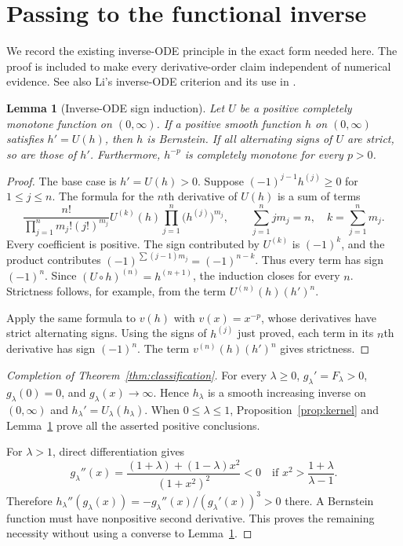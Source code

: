 \documentclass[11pt,a4paper]{article}
\newtheorem{lemma}[theorem]{Lemma}
\theoremstyle{definition}\newtheorem{definition}[theorem]{Definition}
\theoremstyle{remark}\newtheorem{remark}[theorem]{Remark}
\begin{document}
\section{Passing to the functional inverse}\label{sec:ode}

We record the existing inverse-ODE principle in the exact form
needed here. The proof is included to make every derivative-order
claim independent of numerical evidence. See also Li's
inverse-ODE criterion \cite[Lemma~2.6, version~2]{Li2026} and its use in
\cite[APP-0066]{Pudim2026}.

\begin{lemma}[Inverse-ODE sign induction]\label{lem:ode}
Let $U$ be a positive completely monotone function on $(0,\infty)$.
If a positive smooth function $h$ on $(0,\infty)$ satisfies
$h'=U(h)$, then $h$ is Bernstein. If all alternating signs of
$U$ are strict, so are those of $h'$. Furthermore,
$h^{-p}$ is completely monotone for every $p>0$.
\end{lemma}

\begin{proof}
The base case is $h'=U(h)>0$. Suppose
$(-1)^{j-1}h^{(j)}\ge0$ for $1\le j\le n$. The formula for the
$n$th derivative of $U(h)$ is a sum of terms
\begin{equation}\label{eq:faa}
 \frac{n!}{\prod_{j=1}^n m_j!(j!)^{m_j}}
 U^{(k)}(h)\prod_{j=1}^n\bigl(h^{(j)}\bigr)^{m_j},
 \qquad \sum_{j=1}^n j m_j=n,\quad
 k=\sum_{j=1}^n m_j.
\end{equation}
Every coefficient is positive. The sign contributed by
$U^{(k)}$ is $(-1)^k$, and the product contributes
$(-1)^{\sum(j-1)m_j}=(-1)^{n-k}$. Thus every term has sign
$(-1)^n$. Since $(U\circ h)^{(n)}=h^{(n+1)}$, the induction
closes for every $n$. Strictness follows, for example, from the
term $U^{(n)}(h)(h')^n$.

Apply the same formula to $v(h)$ with $v(x)=x^{-p}$, whose
derivatives have strict alternating signs. Using the signs of
$h^{(j)}$ just proved, each term in its $n$th derivative has
sign $(-1)^n$. The term $v^{(n)}(h)(h')^n$ gives strictness.
\end{proof}

\begin{proof}[Completion of Theorem~\ref{thm:classification}]
For every $\lambda\ge0$, $g_\lambda'=F_\lambda>0$,
$g_\lambda(0)=0$, and $g_\lambda(x)\to\infty$. Hence
$h_\lambda$ is a smooth increasing inverse on $(0,\infty)$ and
$h_\lambda'=U_\lambda(h_\lambda)$. When $0\le\lambda\le1$,
Proposition~\ref{prop:kernel} and Lemma~\ref{lem:ode} prove all
the asserted positive conclusions.

For $\lambda>1$, direct differentiation gives
\[
 g_\lambda''(x)
 =\frac{(1+\lambda)+(1-\lambda)x^2}{(1+x^2)^2}<0
 \quad\text{if }x^2>\frac{1+\lambda}{\lambda-1}.
\]
Therefore $h_\lambda''(g_\lambda(x))
=-g_\lambda''(x)/(g_\lambda'(x))^3>0$ there. A Bernstein
function must have nonpositive second derivative. This proves
the remaining necessity without using a converse to
Lemma~\ref{lem:ode}.
\end{proof}
\end{document}
